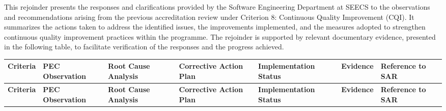 \annexHFirstPageHead
This rejoinder presents the responses and clarifications provided by the Software Engineering Department at SEECS to the observations and recommendations arising from the previous accreditation review under Criterion 8: Continuous Quality Improvement (CQI). It summarizes the actions taken to address the identified issues, the improvements implemented, and the measures adopted to strengthen continuous quality improvement practices within the programme. The rejoinder is supported by relevant documentary evidence, presented in the following table, to facilitate verification of the responses and the progress achieved.
\begin{landscape}
\label{annex:rejoinder}
\scriptsize

\begin{longtable}{|P{2.3cm}|P{5.0cm}|P{4.5cm}|P{5.0cm}|P{2.4cm}|P{2.8cm}|P{1.8cm}|}
\hline
{}
\textbf{Criteria} & \textbf{PEC Observation} & \textbf{Root Cause Analysis} & \textbf{Corrective Action Plan} & \textbf{Implementation Status} & \textbf{Evidence} & \textbf{Reference to SAR} \\
\hline
\endfirsthead
\hline
{}
\textbf{Criteria} & \textbf{PEC Observation} & \textbf{Root Cause Analysis} & \textbf{Corrective Action Plan} & \textbf{Implementation Status} & \textbf{Evidence} & \textbf{Reference to SAR} \\
\hline
\endhead


\end{longtable}
\end{landscape}
